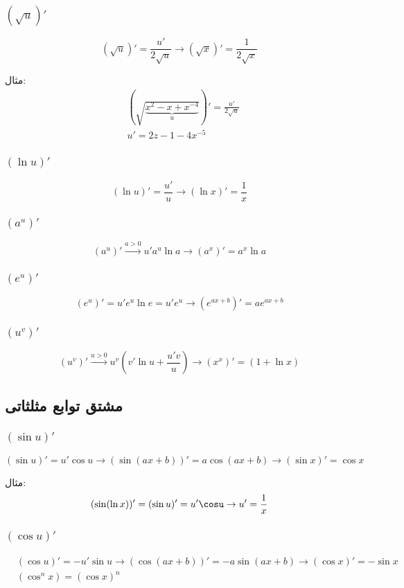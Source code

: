 \subsubsection{$(\sqrt{u})'$}
\[ (\sqrt{u})' = \frac{u'}{2\sqrt{u}} \to (\sqrt{x})' = \frac{1}{2\sqrt{x}} \]

مثال:
\begin{align*}
&(\sqrt{\underbrace{x^2-x+x^{-4}}_u})' = \frac{u'}{2\sqrt{u}} \\
&u' = 2z-1-4x^{-5}
\end{align*}

\subsubsection{$(\ln u)'$}
\[ (\ln u)' = \frac{u'}{u} \to (\ln x)' = \frac{1}{x} \]

\subsubsection{$(a^u)'$}
\[ (a^u)' \overset{a>0}{\longrightarrow} u'a^u\ln a \to (a^x)' = a^x\ln a \]

\subsubsection{$(e^u)'$}
\[ (e^u)' = u'e^u\ln e = u'e^u \to (e^{ax+b})' = ae^{ax+b} \]

\subsubsection{$(u^v)'$}
\[ (u^v)' \overset{u>0}{\longrightarrow} u^v(v'\ln u+\frac{u'v}{u}) \to (x^x)' = (1 + \ln x) \]


\subsection{مشتق توابع مثلثاتی}
\subsubsection{$(\sin u)'$}
\[ (\sin u)' = u'\cos u \longrightarrow (\sin(ax+b))' = a \cos(ax+b) \longrightarrow (\sin x)' = \cos x \]

مثال:
\[ (\sin(\ln x))' = (\sin u)' = u'\cosu \to u' = \frac{1}{x}\]

\subsubsection{$(\cos u)'$}
\begin{align*}
&(\cos u)' = -u'\sin u \longrightarrow (\cos(ax+b))' = -a\sin(ax+b) \to (\cos x)' = -\sin x \\
&(\cos^n x) = (\cos x)^n \\
\end{align*}


